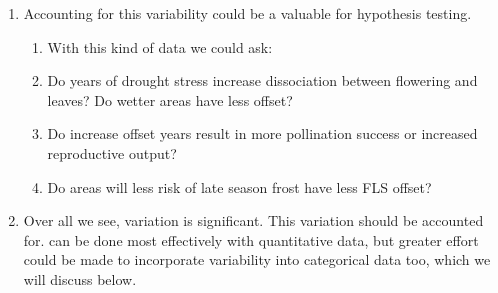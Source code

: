 \documentclass{article}
\begin{document}
\begin{enumerate}
    \item Accounting for this variability could be a valuable for hypothesis testing.
    \begin{enumerate}
        \item With this kind of data we could ask:
        \item Do years of drought stress increase dissociation between flowering and leaves? Do wetter areas have less offset?
        \item Do increase offset years result in more pollination success or increased reproductive output?
        \item Do areas will less risk of late season frost have less FLS offset? 
    \end{enumerate} %

\item Over all we see, variation is significant. This variation should be accounted for. can be done most effectively with quantitative data, but greater effort could be made to incorporate variability into categorical data too, which we will discuss below.
\end{enumerate}
\end{document}
